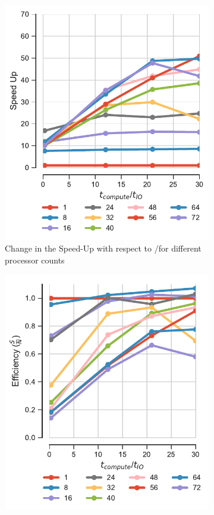 \begin{figure}
\begin{subfigure}{.3\textwidth}
  \includegraphics[width=\linewidth]{figures/Compute_to_IO_ratio_on_performance_2d_2_v17.pdf}
  \caption{Change in the Speed-Up with respect to \tcomp/\tIO for different processor counts}
  \label{fig:S2_tcomp_tIO_effect}
\end{subfigure}
\hfill
\begin{subfigure}{.3\textwidth}
  \includegraphics[width=\linewidth]{figures/Compute_to_IO_ratio_on_performance_2d_3_v17.pdf}

\end{subfigure}
\end{figure}
